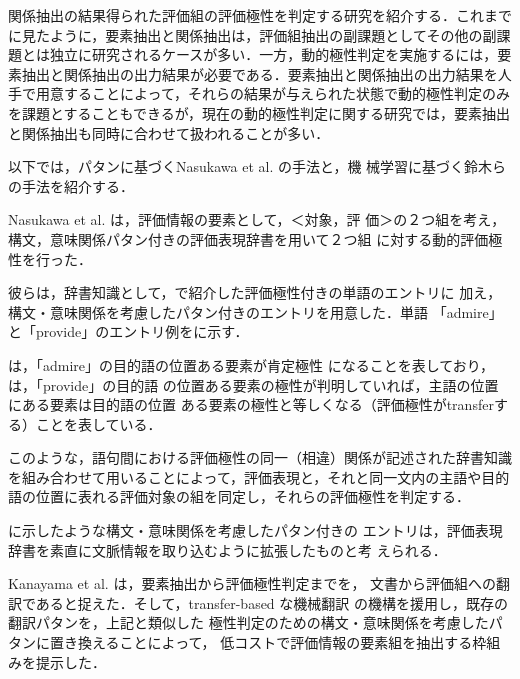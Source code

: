関係抽出の結果得られた評価組の評価極性を判定する研究を紹介する．これまで
に見たように，要素抽出と関係抽出は，評価組抽出の副課題としてその他の副課
題とは独立に研究されるケースが多い．一方，動的極性判定を実施するには，要
素抽出と関係抽出の出力結果が必要である．要素抽出と関係抽出の出力結果を人
手で用意することによって，それらの結果が与えられた状態で動的極性判定のみ
を課題とすることもできるが，現在の動的極性判定に関する研究では，要素抽出
と関係抽出も同時に合わせて扱われることが多い．

以下では，パタンに基づくNasukawa et al. \cite{nasukawa2003a}の手法と，機
械学習に基づく鈴木ら\cite{suzuki2004a}の手法を紹介する．


\vspace{1em}
\underline{\textbf{\cite{nasukawa2003a}}}
\vspace{1em}

Nasukawa et al. \cite{nasukawa2003a}は，評価情報の要素として，＜対象，評
価＞の２つ組を考え，構文，意味関係パタン付きの評価表現辞書を用いて２つ組
に対する動的評価極性を行った．

彼らは，辞書知識として，で紹介した評価極性付きの単語のエントリに
加え，構文・意味関係を考慮したパタン付きのエントリを用意した．単語
「admire」と「provide」のエントリ例をに示す．


は，「admire」の目的語の位置ある要素が肯定極性
になることを表しており，は，「provide」の目的語
の位置ある要素の極性が判明していれば，主語の位置にある要素は目的語の位置
ある要素の極性と等しくなる（評価極性がtransferする）ことを表している．

このような，語句間における評価極性の同一（相違）関係が記述された辞書知識
を組み合わせて用いることによって，評価表現と，それと同一文内の主語や目的
語の位置に表れる評価対象の組を同定し，それらの評価極性を判定する．

に示したような構文・意味関係を考慮したパタン付きの
エントリは，評価表現辞書を素直に文脈情報を取り込むように拡張したものと考
えられる．

Kanayama et al. \cite{kanayama2004a}は，要素抽出から評価極性判定までを，
文書から評価組への翻訳であると捉えた．そして，transfer-based な機械翻訳
の機構を援用し，既存の翻訳パタンを，上記と類似した
極性判定のための構文・意味関係を考慮したパタンに置き換えることによって，
低コストで評価情報の要素組を抽出する枠組みを提示した．


